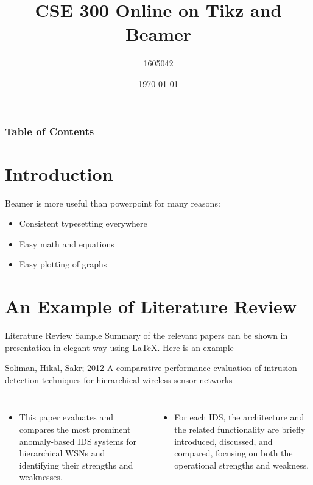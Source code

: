 \documentclass{beamer}
\title[Tic]{CSE 300 Online on Tikz and Beamer}
\author{1605042}
\date{\today}
\begin{document}
	\maketitle
	\begin{frame}
		\frametitle{Table of Contents}
		\tableofcontents
	\end{frame}
	\section{Introduction}
	\begin{frame}
		Beamer is more useful than powerpoint for many reasons:
		\begin{itemize}
			 \item<1-> Consistent typesetting everywhere
			 \item<1-> Easy math and equations
			 \item<2-> Easy plotting of graphs
		\end{itemize}
	\end{frame}
	\section{An Example of Literature Review}
	\begin{frame}{Literature Review Sample}
	Summary of the relevant papers can be shown in presentation in elegant
	way using \LaTeX. Here is an example
	\begin{block}{Soliman, Hikal, Sakr; 2012}
		A comparative performance evaluation of intrusion detection techniques
		for hierarchical wireless sensor networks
	\end{block}
	
	\begin{columns}
		\column{0.5\textwidth}
		\begin{itemize}
		\item This paper evaluates and
		compares the most prominent
		anomaly-based IDS systems for
		hierarchical WSNs and
		identifying their strengths and
		weaknesses.
		\end{itemize}
		\column{0.5\textwidth}
		\begin{itemize}
			\item For each IDS, the architecture
			and the related functionality are
			briefly introduced, discussed,
			and compared, focusing on both
			the operational strengths and
			weakness.
		\end{itemize}
	\end{columns}
	\end{frame}
\end{document}
